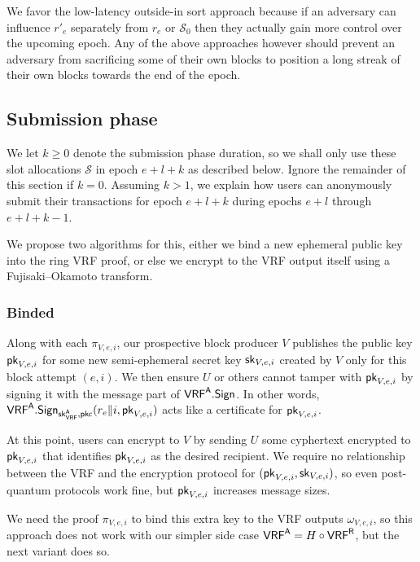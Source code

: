 We favor the low-latency outside-in sort approach because if an adversary can influence $r'_e$ separately from $r_e$ or $\mathcal{S}_0$ then they actually gain more control over the upcoming epoch.  Any of the above approaches however should prevent an adversary from sacrificing some of their own blocks to position a long streak of their own blocks towards the end of the epoch.  


\subsection{Submission phase}\label{subsec:submission_phase}

We let $k \ge 0$ denote the submission phase duration, so we shall only use these slot allocations $\mathcal{S}$ in epoch $e+l+k$ as described below.  Ignore the remainder of this section if $k=0$.  Assuming $k>1$, we explain how users can anonymously submit their transactions for epoch $e+l+k$ during epochs $e+l$ through $e+l+k-1$.

We propose two algorithms for this, either we bind a new ephemeral public key into the ring VRF proof, or else we encrypt to the VRF output itself using a Fujisaki–Okamoto transform. 

\subsubsection{Binded}

Along with each $\pi_{V,e,i}$, our prospective block producer $V$ publishes the public key $\mathsf{pk}_{V,e,i}$ for some new semi-ephemeral secret key $\mathsf{sk}_{V,e,i}$ created by $V$ only for this block attempt $(e,i)$.  We then ensure $U$ or others cannot tamper with $\mathsf{pk}_{V,e,i}$ by signing it with the message part of $\mathsf{VRF}^{\mathsf{A}}.\mathsf{Sign}$.  In other words, $\mathsf{VRF}^{\mathsf{A}}.\mathsf{Sign}_{\mathsf{sk}_{\mathsf{VRF}}^{\mathsf{A}},\mathsf{pkc}}(r_e \| i, \mathsf{pk}_{V,e,i})$ acts like a certificate for $\mathsf{pk}_{V,e,i}$.

At this point, users can encrypt to $V$ by sending $U$ some cyphertext encrypted to $\mathsf{pk}_{V,e,i}$ that identifies $\mathsf{pk}_{V,e,i}$ as the desired recipient.  We require no relationship between the VRF and the encryption protocol for $(\mathsf{pk}_{V,e,i},\mathsf{sk}_{V,e,i})$, so even post-quantum protocols work fine, but $\mathsf{pk}_{V,e,i}$ increases message sizes.

We need the proof $\pi_{V,e,i}$ to bind this extra key to the VRF outputs $\omega_{V,e,i}$, so this approach does not work with our simpler side case $\mathsf{VRF}^{\mathsf{A}} = H \circ \mathsf{VRF}^{\mathsf{R}}$, but the next variant does so.

